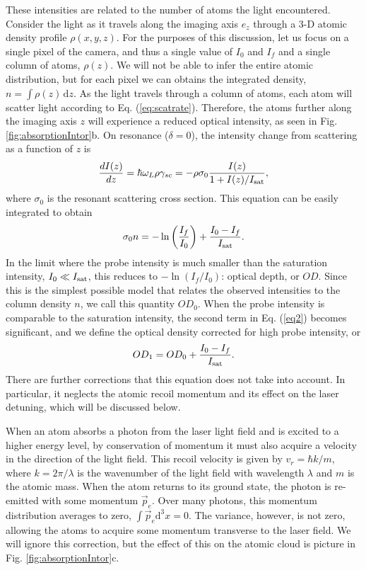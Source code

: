 \documentclass[12pt]{iopart}
\begin{document}
\par These intensities are related to the number of atoms the light encountered. Consider the light as it travels along the imaging axis $e_z$ through a 3-D atomic density profile $\rho(x,y,z)$. For the purposes of this discussion, let us focus on a single pixel of the camera, and thus a single value of $I_0$ and $I_f$ and a single column of atoms, $\rho(z)$. We will not be able to infer the entire atomic distribution, but for each pixel we can obtains the integrated density, $n = \int \rho\left(z\right) \,\mathrm{d}z$. As the light travels through a column of atoms, each atom will scatter light according to Eq. (\ref{eq:scatrate}). Therefore, the atoms further along the imaging axis $z$ will experience a reduced optical intensity, as seen in Fig. \ref{fig:absorptionIntor}b. On resonance ($\delta=0$), the intensity change from scattering as a function of $z$ is
\begin{equation}
\frac{dI(z)}{dz}=\hbar\omega_L\rho\gamma_{sc}=-\rho\sigma_0\frac{I(z)}{1+I(z)/I_{\rm{sat}}},
\end{equation}
where $\sigma_0$ is the resonant scattering cross section. 
 This equation can be easily integrated to obtain  \cite{Reinaudi07}
\begin{equation} 
\sigma_0 n = -\ln\left(\frac{I_f}{I_0}\right) + \frac{I_0-I_f}{I_{\rm{sat}}}.
\label{eq2}
\end{equation}
In the limit where the probe intensity is much smaller than the saturation intensity, $I_0\ll I_{\rm{sat}}$, this reduces to $-\ln \left(I_f/I_0\right)$: optical depth, or $OD$. Since this is the simplest possible model that relates the observed intensities to the column density $n$, we call this quantity $OD_0$. When the probe intensity is comparable to the saturation intensity, the second term in Eq. (\ref{eq2}) becomes significant, and we define the optical density corrected for high probe intensity, or
\begin{equation} 
OD_1 = OD_0 + \frac{I_0-I_f}{I_{\rm{sat}}}.
\label{eq:OD1}
\end{equation}
There are further corrections that this equation does not take into account. In particular, it neglects the atomic recoil momentum and its effect on the laser detuning, which will be discussed below.
\par When an atom absorbs a photon from the laser light field and is excited to a higher energy level, by conservation of momentum it must also acquire a velocity in the direction of the light field. This recoil velocity is given by $v_r=\hbar k/m$, where $k=2\pi/\lambda$ is the wavenumber of the light field with wavelength $\lambda$ and $m$ is the atomic mass. When the atom returns to its ground state, the photon is re-emitted with some momentum $\vec{p}_e$. Over many photons, this momentum distribution averages to zero, $\int\vec{p}_e\mathrm{d}^3 x=0$.  The variance, however, is not zero, allowing the atoms to acquire some momentum transverse to the laser field. We will ignore this correction, but the effect of this on the atomic cloud is picture in Fig. \ref{fig:absorptionIntor}c. 
\end{document}

